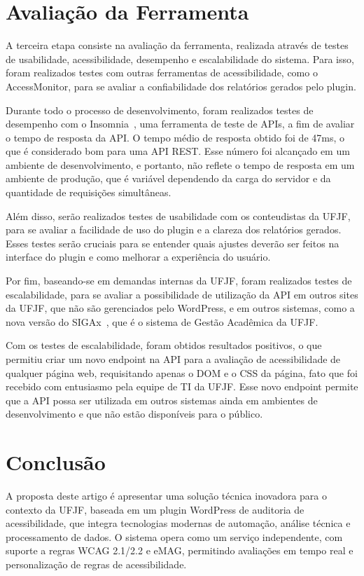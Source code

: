 \documentclass[
    12pt,
    a4paper,
    oneside,
    brazil,
    english
]{article}
\begin{document}
\section*{Avaliação da Ferramenta}
A terceira etapa consiste na avaliação da ferramenta, realizada
através de testes de usabilidade, acessibilidade, desempenho e escalabilidade
do sistema. Para isso, foram realizados testes com outras ferramentas de
acessibilidade, como o AccessMonitor, para se avaliar a
confiabilidade dos relatórios gerados pelo plugin.

Durante todo o processo
de desenvolvimento, foram realizados testes de desempenho com o Insomnia~\cite{insomnia},
uma ferramenta de teste de APIs, a fim de avaliar o tempo de resposta da API.
O tempo médio de resposta obtido foi de 47ms, o que é considerado
bom para uma API REST. Esse número foi alcançado em um ambiente
de desenvolvimento, e portanto, não reflete o tempo de resposta em um
ambiente de produção, que é variável dependendo da
carga do servidor e da quantidade de requisições simultâneas.

Além disso, serão realizados testes de usabilidade com os conteudistas da
UFJF, para se avaliar a facilidade de uso do plugin e a clareza dos relatórios
gerados. Esses testes serão cruciais para se entender quais ajustes deverão
ser feitos na interface do plugin e como melhorar a experiência do usuário.

Por fim, baseando-se em demandas internas da UFJF, foram realizados testes
de escalabilidade, para se avaliar a possibilidade de utilização da API
em outros sites da UFJF, que não são gerenciados pelo WordPress, e em outros sistemas,
como a nova versão do SIGAx~\cite{SIGAx}, que é o sistema de Gestão Acadêmica da UFJF\@.

Com os testes de escalabilidade, foram obtidos resultados positivos, o que
permitiu criar um novo endpoint na API para a avaliação de acessibilidade
de qualquer página web, requisitando apenas o DOM e o CSS da página, fato que foi recebido
com entusiasmo pela equipe de TI da UFJF\@. Esse novo endpoint permite que
a API possa ser utilizada em outros sistemas ainda em ambientes de desenvolvimento
e que não estão disponíveis para o público.

\section*{Conclusão}
A proposta deste artigo é apresentar uma solução técnica inovadora para o
contexto da UFJF, baseada em um plugin WordPress de auditoria de acessibilidade,
que integra tecnologias modernas de automação, análise técnica e
processamento de dados. O sistema opera como um serviço independente, com
suporte a regras WCAG 2.1/2.2 e eMAG, permitindo avaliações em tempo real
e personalização de regras de acessibilidade.
\end{document}
